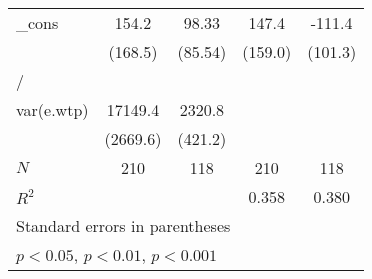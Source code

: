 {\begin{tabular}{l*{4}{c}}
\addlinespace
\_cons      &       154.2         &       98.33         &       147.4         &      -111.4         \\
            &     (168.5)         &     (85.54)         &     (159.0)         &     (101.3)         \\
\midrule
/           &                     &                     &                     &                     \\
var(e.wtp)  &     17149.4\sym{***}&      2320.8\sym{***}&                     &                     \\
            &    (2669.6)         &     (421.2)         &                     &                     \\
\midrule
\(N\)       &         210         &         118         &         210         &         118         \\
\(R^{2}\)   &                     &                     &       0.358         &       0.380         \\
\bottomrule
\multicolumn{5}{l}{\footnotesize Standard errors in parentheses}\\
\multicolumn{5}{l}{\footnotesize \sym{*} \(p<0.05\), \sym{**} \(p<0.01\), \sym{***} \(p<0.001\)}\\
\end{tabular}
}
